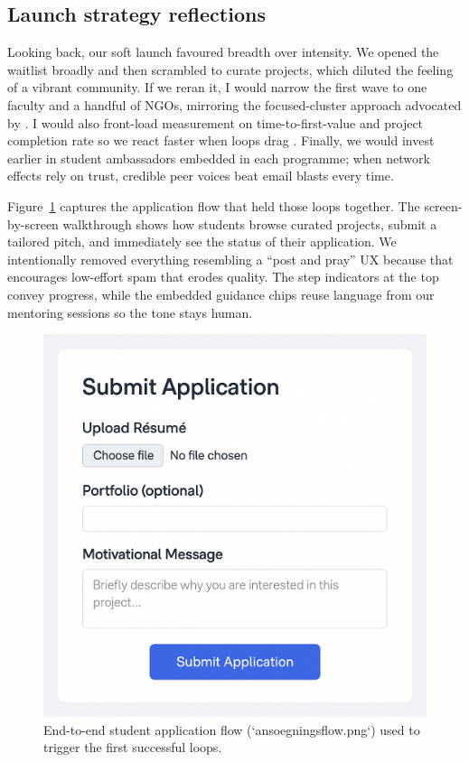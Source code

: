 \subsection*{Launch strategy reflections}
Looking back, our soft launch favoured breadth over intensity. We opened the waitlist broadly and then scrambled to curate projects, which diluted the feeling of a vibrant community. If we reran it, I would narrow the first wave to one faculty and a handful of NGOs, mirroring the focused-cluster approach advocated by \citet{Choudary2016}. I would also front-load measurement on time-to-first-value and project completion rate so we react faster when loops drag \citep{ShapiroVarian1999}. Finally, we would invest earlier in student ambassadors embedded in each programme; when network effects rely on trust, credible peer voices beat email blasts every time.

Figure~\ref{fig:application-flow} captures the application flow that held those loops together. The screen-by-screen walkthrough shows how students browse curated projects, submit a tailored pitch, and immediately see the status of their application. We intentionally removed everything resembling a ``post and pray'' UX because that encourages low-effort spam that erodes quality. The step indicators at the top convey progress, while the embedded guidance chips reuse language from our mentoring sessions so the tone stays human.

\begin{figure}[h]
  \centering
  \includegraphics[width=0.85\linewidth]{figures/ansoegningsflow.png}
  \caption{End-to-end student application flow (`ansoegningsflow.png`) used to trigger the first successful loops.}
  \label{fig:application-flow}
\end{figure}

